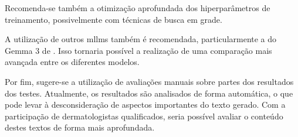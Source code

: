 Recomenda-se também a otimização aprofundada dos hiperparâmetros de treinamento, possivelmente com técnicas de busca em
grade.

A utilização de outros \acp{mllm} também é recomendada, particularmente a do Gemma 3 de \textcite{team2025gemma}. Isso
tornaria possível a realização de uma comparação mais avançada entre os diferentes modelos.

Por fim, sugere-se a utilização de avaliações manuais sobre partes dos resultados dos testes. Atualmente, os resultados
são analisados de forma automática, o que pode levar à desconsideração de aspectos importantes do texto gerado. Com a
participação de dermatologistas qualificados, seria possível avaliar o conteúdo destes textos de forma mais
aprofundada.
